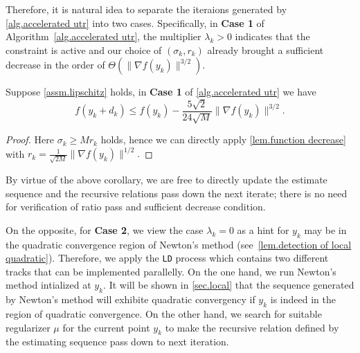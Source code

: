 \documentclass{article}
\begin{document}
Therefore, it is natural idea to separate the iteraions generated by \autoref{alg.accelerated utr} into two cases. Specifically, in \textbf{Case 1} of Algorithm~\ref{alg.accelerated utr}, the multiplier $\lambda_k>0$ indicates that the constraint is active and our choice of $(\sigma_k,r_k)$ already brought a sufficient decrease in the order of  $\Theta(\|\nabla f(y_k)\|^{3/2})$. 
\begin{corollary}
    Suppose \autoref{assm.lipschitz} holds, in \textbf{Case 1} of \autoref{alg.accelerated utr} we have
    \begin{equation}
        \label{eq.decrease of order 1.5}
        f(y_k+d_k) \leq f(y_k)-\frac{5\sqrt{2}}{24\sqrt{M}}\|\nabla f(y_k)\|^{3/2}.
    \end{equation}
\end{corollary}
\begin{proof}
    Here $\sigma_k \geq M r_k$ holds, hence we can directly apply \autoref{lem.function decrease} with $r_k = \frac{1}{\sqrt{2M}} \|\nabla f(y_k)\|^{1/2}.$
\end{proof}

By virtue of the above corollary, we are free to directly update the estimate sequence and the recursive relations pass down the next iterate; there is no need for verification of ratio pass and sufficient decrease condition.

On the opposite, for \textbf{Case 2}, we view the case $\lambda_k=0$ as a hint for $y_k$ may be in the quadratic convergence region of Newton's method (see~\autoref{lem.detection of local quadratic}). Therefore, we apply the \texttt{LD} process which contains two different tracks that can be implemented parallelly. On the one hand, we run Newton's method intialized at $y_k$. It will be shown in \autoref{sec.local} that the sequence generated by Newton's method will exhibite quadratic convergency if $y_k$ is indeed in the region of quadratic convergence. On the other hand, we search for suitable regularizer $\mu$ for the current point $y_k$ to make the recursive relation defined by the estimating sequence pass down to next iteration.
\end{document}
